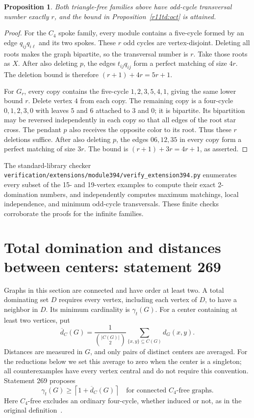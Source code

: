 \documentclass[11pt,a4paper]{article}
\newtheorem{proposition}[theorem]{Proposition}
\theoremstyle{definition}\newtheorem{definition}[theorem]{Definition}
\theoremstyle{remark}\newtheorem{remark}[theorem]{Remark}
\newcommand{\ceil}[1]{\left\lceil#1\right\rceil}
\begin{document}
\begin{proposition}\label{r11td:octsharp}
Both triangle-free families above have odd-cycle transversal number
exactly $r$, and the bound in Proposition~\ref{r11td:oct} is attained.
\end{proposition}
\begin{proof}
For the $C_4$ spoke family, every module contains a five-cycle formed
by an edge $q_{ij}q_{i\ell}$ and its two spokes. These $r$ odd cycles
are vertex-disjoint. Deleting all roots makes the graph bipartite,
so the transversal number is $r$. Take those roots as $X$. After also
deleting $p$, the edges $t_{ij}q_{ij}$ form a perfect matching of size
$4r$. The deletion bound is therefore $(r+1)+4r=5r+1$.

For $G_r$, every copy contains the five-cycle $1,2,3,5,4,1$, giving
the same lower bound $r$. Delete vertex $4$ from each copy.
The remaining copy is a four-cycle $0,1,2,3,0$ with leaves $5$ and $6$
attached to $3$ and $0$; it is bipartite. Its bipartition may be reversed
independently in each copy so that all edges of the root star cross.
The pendant $p$ also receives the opposite color to its root.
Thus these $r$ deletions suffice. After also deleting $p$, the edges
$06,12,35$ in every copy form a perfect matching of size $3r$.
The bound is $(r+1)+3r=4r+1$, as asserted.
\end{proof}
The standard-library checker \nolinkurl{verification/extensions/module394/verify_extension394.py} enumerates every
subset of the 15- and 19-vertex examples to compute their exact
2-domination numbers, and independently computes maximum matchings,
local independence, and minimum odd-cycle transversals. These finite
checks corroborate the proofs for the infinite families.


\section{Total domination and distances between centers: statement 269}
\label{early:sec:269}

Graphs in this section are connected and have order at least two.
A total dominating set $D$ requires every vertex, including each vertex
of $D$, to have a neighbor in $D$.  Its minimum cardinality is
$\gamma_t(G)$.  For a center containing at least two vertices, put
\[
 \overline d_C(G)=\frac{1}{\binom{|C(G)|}{2}}
       \sum_{\{x,y\}\subseteq C(G)}d_G(x,y).
\]
Distances are measured in $G$, and only pairs of distinct centers are
averaged.  For the reductions below we set this average to zero when
the center is a singleton; all counterexamples have every vertex
central and do not require this convention.  Statement 269 proposes
\begin{equation}
 \gamma_t(G)\geq\ceil{1+\overline d_C(G)}
 \quad\text{for connected $C_4$-free graphs.}
 \label{early:eq:269-original}
\end{equation}
Here $C_4$-free excludes an ordinary four-cycle, whether induced or not,
as in the original definition~\cite{src:catalogue,src:definitions}.
\end{document}
